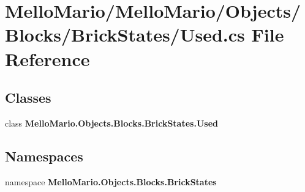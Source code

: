 \section{Mello\+Mario/\+Mello\+Mario/\+Objects/\+Blocks/\+Brick\+States/\+Used.cs File Reference}
\label{BrickStates_2Used_8cs}
\subsection*{Classes}
\begin{DoxyCompactItemize}
\item 
class \textbf{ Mello\+Mario.\+Objects.\+Blocks.\+Brick\+States.\+Used}
\end{DoxyCompactItemize}
\subsection*{Namespaces}
\begin{DoxyCompactItemize}
\item 
namespace \textbf{ Mello\+Mario.\+Objects.\+Blocks.\+Brick\+States}
\end{DoxyCompactItemize}
